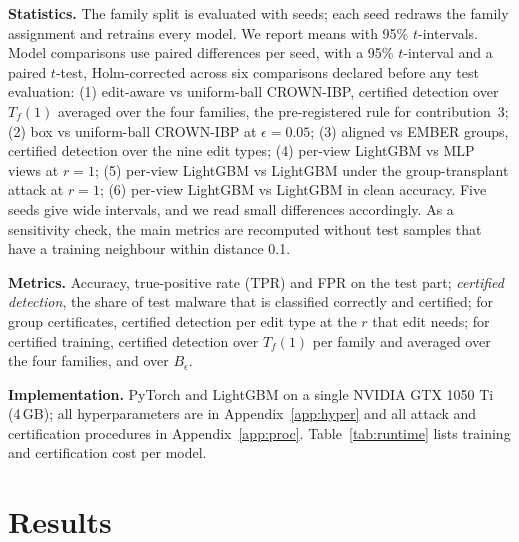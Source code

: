 \documentclass[preprint,12pt,authoryear]{elsarticle}
\begin{document}
\textbf{Statistics.} The family split is evaluated with \NSeedsFam{} seeds; each seed redraws the family assignment and retrains every model. We report means with 95\% $t$-intervals. Model comparisons use paired differences per seed, with a 95\% $t$-interval and a paired $t$-test, Holm-corrected across six comparisons declared before any test evaluation: (1) edit-aware vs uniform-ball CROWN-IBP, certified detection over $T_f(1)$ averaged over the four families, the pre-registered rule for contribution~3; (2) box vs uniform-ball CROWN-IBP at $\epsilon=0.05$; (3) aligned vs EMBER groups, certified detection over the nine edit types; (4) per-view LightGBM vs MLP views at $r=1$; (5) per-view LightGBM vs LightGBM under the group-transplant attack at $r=1$; (6) per-view LightGBM vs LightGBM in clean accuracy. Five seeds give wide intervals, and we read small differences accordingly. As a sensitivity check, the main metrics are recomputed without test samples that have a training neighbour within distance 0.1.

\textbf{Metrics.} Accuracy, true-positive rate (TPR) and FPR on the test part; \emph{certified detection}, the share of test malware that is classified correctly and certified; for group certificates, certified detection per edit type at the $r$ that edit needs; for certified training, certified detection over $T_f(1)$ per family and averaged over the four families, and over $B_\epsilon$.

\textbf{Implementation.} PyTorch and LightGBM on a single NVIDIA GTX 1050 Ti (4\,GB); all hyperparameters are in Appendix~\ref{app:hyper} and all attack and certification procedures in Appendix~\ref{app:proc}. Table~\ref{tab:runtime} lists training and certification cost per model.

\FloatBarrier
\section{Results}\label{sec:results}


\FloatBarrier
\end{document}
